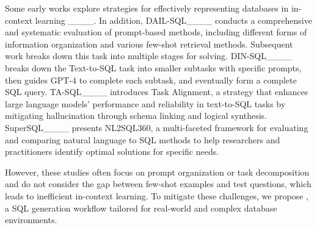 Some early works explore strategies for effectively representing databases in in-context learning
____. 
In addition, DAIL-SQL____ conducts a comprehensive and systematic evaluation of prompt-based methods, including different forms of information organization and various few-shot retrieval methods.
Subsequent work breaks down this task into multiple stages for solving.
DIN-SQL____ breaks down the Text-to-SQL task into smaller subtasks with specific prompts, then guides GPT-4 to complete each subtask, and eventually form a complete SQL query. 
TA-SQL____ introduces Task Alignment, a strategy that enhances large language models' performance and reliability in text-to-SQL tasks by mitigating hallucination through schema linking and logical synthesis.
SuperSQL____ presents NL2SQL360, a multi-faceted framework for evaluating and comparing natural language to SQL methods to help researchers and practitioners identify optimal solutions for specific needs. 

However, these studies often focus on prompt organization or task decomposition and do not consider the gap between few-shot examples and test questions, which leads to inefficient in-context learning. 
To mitigate these challenges, we propose \model, a SQL generation workflow tailored for real-world and complex database environments.